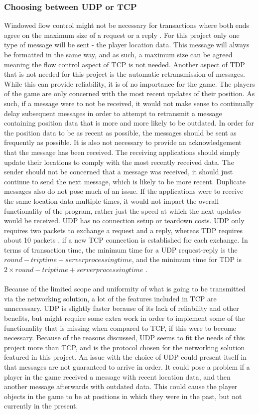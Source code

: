 \subsubsection{Choosing between UDP or TCP}
Windowed flow control might not be necessary for transactions where both ends agree on the maximum size of a request or a reply \cite{socketnetworking}.
For this project only one type of message will be sent - the player location data.
This message will always be formatted in the same way, and as such, a maximum size can be agreed meaning the flow control aspect of TCP is not needed.
Another aspect of TDP that is not needed for this project is the automatic retransmission of messages.
While this can provide reliability, it is of no importance for the game.
The players of the game are only concerned with the most recent updates of their position.
As such, if a message were to not be received, it would not make sense to continually delay subsequent messages in order to attempt to retransmit a message containing position data that is more and more likely to be outdated.
In order for the position data to be as recent as possible, the messages should be sent as frequently as possible.
It is also not necessary to provide an acknowledgement that the message has been received.
The receiving applications should simply update their locations to comply with the most recently received data.
The sender should not be concerned that a message was received, it should just continue to send the next message, which is likely to be more recent.
Duplicate messages also do not pose much of an issue.
If the applications were to receive the same location data multiple times, it would not impact the overall functionality of the program, rather just the speed at which the next updates would be received.
UDP has no connection setup or teardown costs.
UDP only requires two packets to exchange a request and a reply, whereas TDP requires about 10 packets \cite{socketnetworking}, if a new TCP connection is established for each exchange.
In terms of transaction time, the minimum time for a UDP request-reply is the $round-trip time + server processing time$, and the minimum time for TDP is $2 \times round-trip time + server processing time$ \cite{socketnetworking}.
\\\\
Because of the limited scope and uniformity of what is going to be transmitted via the networking solution, a lot of the features included in TCP are unnecessary.
UDP is slightly faster because of its lack of reliability and other benefits, but might require some extra work in order to implement some of the functionality that is missing when compared to TCP, if this were to become necessary.
Because of the reasons discussed, UDP seems to fit the needs of this project more than TCP, and is the protocol chosen for the networking solution featured in this project.
An issue with the choice of UDP could present itself in that messages are not guaranteed to arrive in order.
It could pose a problem if a player in the game received a message with recent location data, and then another message afterwards with outdated data.
This could cause the player objects in the game to be at positions in which they were in the past, but not currently in the present.

